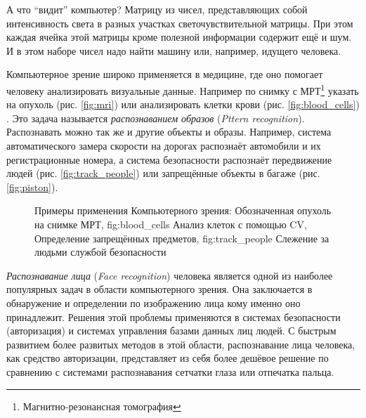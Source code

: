 \documentclass[12pt]{report}
\begin{document}
А что ``видит'' компьютер? Матрицу из чисел, представляющих собой интенсивность света в разных участках 
светочувствительной матрицы. При этом каждая ячейка этой матрицы кроме полезной информации содержит ещё и шум. И в 
этом наборе чисел надо найти машину или, например, идущего человека.

Компьютерное зрение широко применяется в медицине, где оно помогает человеку анализировать визуальные данные. 
Например по снимку с МРТ\footnote{Магнитно-резонансная томография} указать на опухоль (рис.  \ref{fig:mri}) или 
анализировать клетки крови (рис. \ref{fig:blood_cells}) . Это задача называется \emph{распознаванием образов} 
(\textit{Pttern recognition}). Распознавать можно так же и другие объекты и образы. Например, система автоматического 
замера скорости на дорогах распознаёт автомобили и их регистрационные номера, а система безопасности распознаёт 
передвижение людей (рис. \ref{fig:track_people}) или запрещённые объекты в багаже (рис. \ref{fig:piston}).

\begin{figure}[h]
	\centering
		
	\caption{Примеры применения Компьютерного зрения:  Обозначенная опухоль на снимке МРТ, \subref
{fig:blood_cells} Анализ клеток с помощью CV,  Определение запрещённых предметов, \subref
{fig:track_people} Слежение за людьми службой безопасности}
	\label{fig:cv_usage}
\end{figure}


\emph{Распознавание лица} (\textit{Face recognition}) человека является одной из наиболее популярных задач в области 
компьютерного зрения. Она заключается в обнаружение и определении по изображению лица кому именно оно принадлежит. 
Решения этой проблемы применяются в системах безопасности (авторизация) и системах управления базами данных лиц 
людей. %
С быстрым развитием более развитых методов в этой области, распознавание лица человека, как средство авторизации, 
представляет из себя более дешёвое решение по сравнению с системами распознавания сетчатки глаза или отпечатка 
пальца. \citep{kumar2006efficient}
\end{document}
